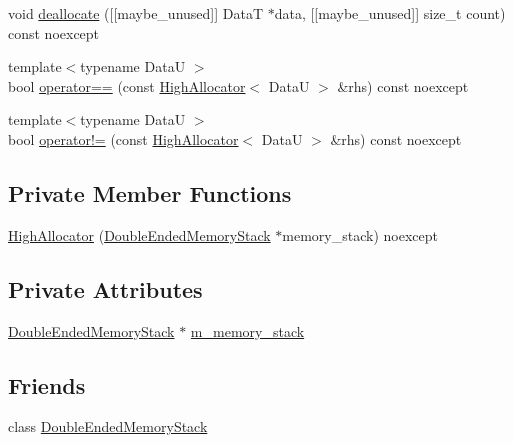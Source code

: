 \begin{DoxyCompactItemize}
\item 
void \hyperlink{structmage_1_1_double_ended_memory_stack_1_1_high_allocator_a83581ea8c009f8fa5b623be7ffeb6c53}{deallocate} (\mbox{[}\mbox{[}maybe\+\_\+unused\mbox{]}\mbox{]} DataT $\ast$data, \mbox{[}\mbox{[}maybe\+\_\+unused\mbox{]}\mbox{]} size\+\_\+t count) const noexcept
\item 
{\footnotesize template$<$typename DataU $>$ }\\bool \hyperlink{structmage_1_1_double_ended_memory_stack_1_1_high_allocator_a452887cb961e5a0f6919d0497c0e2617}{operator==} (const \hyperlink{structmage_1_1_double_ended_memory_stack_1_1_high_allocator}{High\+Allocator}$<$ DataU $>$ \&rhs) const noexcept
\item 
{\footnotesize template$<$typename DataU $>$ }\\bool \hyperlink{structmage_1_1_double_ended_memory_stack_1_1_high_allocator_a3857539e5308e88fb0454ecab7bbeda8}{operator!=} (const \hyperlink{structmage_1_1_double_ended_memory_stack_1_1_high_allocator}{High\+Allocator}$<$ DataU $>$ \&rhs) const noexcept
\end{DoxyCompactItemize}
\subsection*{Private Member Functions}
\begin{DoxyCompactItemize}
\item 
\hyperlink{structmage_1_1_double_ended_memory_stack_1_1_high_allocator_a6d51325f813c70290379dcb472d093c3}{High\+Allocator} (\hyperlink{classmage_1_1_double_ended_memory_stack}{Double\+Ended\+Memory\+Stack} $\ast$memory\+\_\+stack) noexcept
\end{DoxyCompactItemize}
\subsection*{Private Attributes}
\begin{DoxyCompactItemize}
\item 
\hyperlink{classmage_1_1_double_ended_memory_stack}{Double\+Ended\+Memory\+Stack} $\ast$ \hyperlink{structmage_1_1_double_ended_memory_stack_1_1_high_allocator_a068864bc36afb8d749c71c6814a1b5c9}{m\+\_\+memory\+\_\+stack}
\end{DoxyCompactItemize}
\subsection*{Friends}
\begin{DoxyCompactItemize}
\item 
class \hyperlink{structmage_1_1_double_ended_memory_stack_1_1_high_allocator_a10ae729d55b8c0017057250445835680}{Double\+Ended\+Memory\+Stack}
\end{DoxyCompactItemize}


